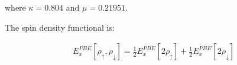 where $\kappa = 0.804$ and $\mu = 0.21951$.

The spin density functional is:

\begin{equation}
\begin{split}
E_{x}^{PBE} [\rho_{\uparrow}, \rho_{\downarrow}] = \frac{1}{2} E_{x}^{PBE} [2 \rho_{\uparrow}] + \frac{1}{2} E_{x}^{PBE} [2 \rho_{\downarrow}]
\end{split}
\label{eq:functional9}
\end{equation}


